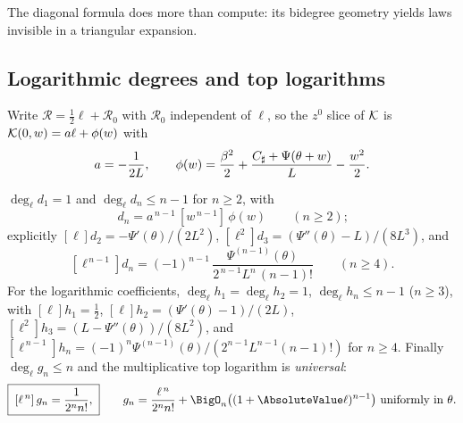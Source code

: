 The diagonal formula does more than compute: its bidegree geometry
yields laws invisible in a triangular expansion.

\subsection{Logarithmic degrees and top logarithms}

Write $\mathcal R=\tfrac12\ell+\mathcal R_0$ with $\mathcal R_0$
independent of $\ell$, so the $z^{0}$ slice of $\mathcal K$ is
$\mathcal K(0,w)=a\ell+\phi(w)$ with
\begin{equation}
 a=-\frac1{2L},
 \qquad
 \phi(w)=\frac{\beta^{2}}2+\frac{C_{\sharp}+\Psi(\theta+w)}L
 -\frac{w^{2}}2.
 \label{ao:eq:a-phi}
\end{equation}

\begin{theorem}
\label{ao:thm:top-log}
$\deg_\ell d_1=1$ and $\deg_\ell d_n\le n-1$ for $n\ge2$, with
\begin{equation}
 [\ell^{\,n-1}]\,d_n=a^{\,n-1}\,[w^{\,n-1}]\,\phi(w)
 \qquad(n\ge2);
 \label{ao:eq:d-top-log}
\end{equation}
explicitly $[\ell]d_2=-\Psi'(\theta)/(2L^{2})$,
$[\ell^{2}]d_3=(\Psi''(\theta)-L)/(8L^{3})$, and
\[
 [\ell^{\,n-1}]d_n
 =(-1)^{n-1}\,
 \frac{\Psi^{(n-1)}(\theta)}{2^{\,n-1}L^{n}\,(n-1)!}
 \qquad(n\ge4).
\]
For the logarithmic coefficients,
$\deg_\ell h_1=\deg_\ell h_2=1$, $\deg_\ell h_n\le n-1$
($n\ge3$), with $[\ell]h_1=\tfrac12$,
$[\ell]h_2=(\Psi'(\theta)-1)/(2L)$,
$[\ell^{2}]h_3=(L-\Psi''(\theta))/(8L^{2})$, and
$[\ell^{\,n-1}]h_n
=(-1)^{n}\Psi^{(n-1)}(\theta)/(2^{n-1}L^{n-1}(n-1)!)$ for
$n\ge4$.  Finally $\deg_\ell g_n\le n$ and the multiplicative top
logarithm is \emph{universal}:
\begin{equation}
 \boxed{\;[\ell^{\,n}]\,g_n=\frac1{2^{n}n!},\;}
 \qquad
 g_n=\frac{\ell^{\,n}}{2^{n}n!}
 +\BigO_n\bigl((1+\AbsoluteValue\ell)^{n-1}\bigr)
 \text{ uniformly in }\theta.
 \label{ao:eq:universal-top-log}
\end{equation}
\end{theorem}

